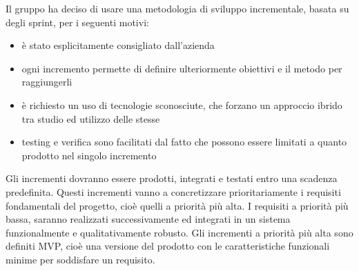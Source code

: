 Il gruppo ha deciso di usare una metodologia di sviluppo incrementale, 
basata su degli sprint, per i seguenti motivi:
\begin{itemize}
    \item 
        è stato esplicitamente consigliato dall'azienda
    \item 
        ogni incremento permette di definire ulteriormente 
        obiettivi e il metodo per raggiungerli
    \item 
        è richiesto un uso di tecnologie sconosciute, che forzano un 
        approccio ibrido tra studio ed utilizzo delle stesse
    \item
        testing e verifica sono facilitati dal fatto che possono essere 
        limitati a quanto prodotto nel singolo incremento
\end{itemize}
Gli incrementi dovranno essere prodotti, integrati e testati entro
una scadenza predefinita. Questi incrementi vanno a concretizzare 
prioritariamente i requisiti fondamentali del progetto, cioè quelli a 
priorità più alta. I requisiti a priorità più bassa, saranno realizzati
successivamente ed integrati in un sistema funzionalmente e qualitativamente robusto.
Gli incrementi a priorità più alta sono definiti MVP, cioè una versione
del prodotto con le caratteristiche funzionali minime per soddisfare un requisito.




